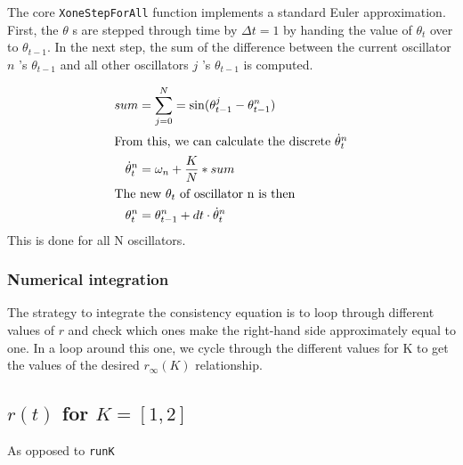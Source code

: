 \documentclass[10pt,a4paper]{article}
\begin{document}
The core \texttt{XoneStepForAll} function implements a standard Euler approximation.
First, the $\theta$ s are stepped through time by $\Delta t = 1$ by handing the value of $\theta_{t}$ over to $\theta_{t-1}$. 
In the next step, the sum of the difference between the current oscillator $n$ 's $\theta_{t-1}$ and all other oscillators $j$ 's $\theta_{t-1}$ is computed. 


\begin{align*}
	sum 					& = \sum_{j = 0}^N = \sin(\theta^j_{t-1} - \theta^n_{t-1}) \\
\intertext{From this, we can calculate the discrete $\dot{\theta}_t^n$}
	\dot{\theta}_t^n 		& = \omega_n + \frac{K}{N} *  sum \\
\intertext{The new $\theta_t$ of oscillator n is then}
	\theta^n_t 				& = \theta^n_{t-1} + dt \cdot \dot{\theta}_t^n \\
\end{align*}
This is done for all N oscillators. 








\subsubsection{Numerical integration}


The strategy to integrate the consistency equation is to loop through different values of $r$ and check which ones make the right-hand side approximately equal to one. 
In a loop around this one, we cycle through the different values for K to get the values of the desired $r_\infty(K)$ relationship. 















\subsection{$r(t)$ for $K = [1, 2]$} \label{r(t)}

As opposed to \texttt{runK}
\end{document}
